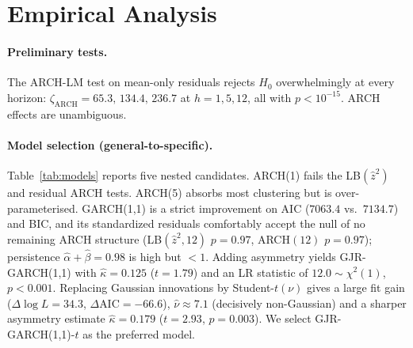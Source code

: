 \documentclass[12pt]{article}
\begin{document}
\section{Empirical Analysis}

\paragraph{Preliminary tests.} The ARCH-LM test on mean-only residuals rejects $H_0$ overwhelmingly at every horizon: $\zeta_{\text{ARCH}}=65.3,\,134.4,\,236.7$ at $h=1,5,12$, all with $p<10^{-15}$. ARCH effects are unambiguous.

\paragraph{Model selection (general-to-specific).} Table~\ref{tab:models} reports five nested candidates. ARCH(1) fails the LB$(\hat z^2)$ and residual ARCH tests. ARCH(5) absorbs most clustering but is over-parameterised. GARCH(1,1) is a strict improvement on AIC ($7063.4$ vs.\ $7134.7$) and BIC, and its standardized residuals comfortably accept the null of no remaining ARCH structure (LB$(\hat z^2,12)$ $p=0.97$, ARCH$(12)$ $p=0.97$); persistence $\hat\alpha+\hat\beta=0.98$ is high but $<1$. Adding asymmetry yields GJR-GARCH(1,1) with $\hat\kappa=0.125$ ($t=1.79$) and an LR statistic of $12.0\sim\chi^2(1)$, $p<0.001$. Replacing Gaussian innovations by Student-$t(\nu)$ gives a large fit gain ($\Delta\log L=34.3$, $\Delta\text{AIC}=-66.6$), $\hat\nu\approx 7.1$ (decisively non-Gaussian) and a sharper asymmetry estimate $\hat\kappa=0.179$ ($t=2.93$, $p=0.003$). We select GJR-GARCH(1,1)-$t$ as the preferred model.

\begin{table}[H]\centering\footnotesize
\renewcommand{\arraystretch}{0.9}
\caption{Model comparison. Robust (sandwich) SEs in parentheses; (Q)MLE, constant mean. Persistence is $\sum_j\alpha_j$ for ARCH($q$), $\alpha+\beta$ for GARCH(1,1), $\alpha+\beta+\tfrac12\kappa$ for GJR. Diagnostics: Ljung--Box at $h{=}12$ on $\hat z_t$ and $\hat z_t^2$, ARCH-LM at $h{=}12$ on $\hat z_t$, and Jarque--Bera on $\hat z_t$.}
\label{tab:models}

\end{table}
\end{document}
